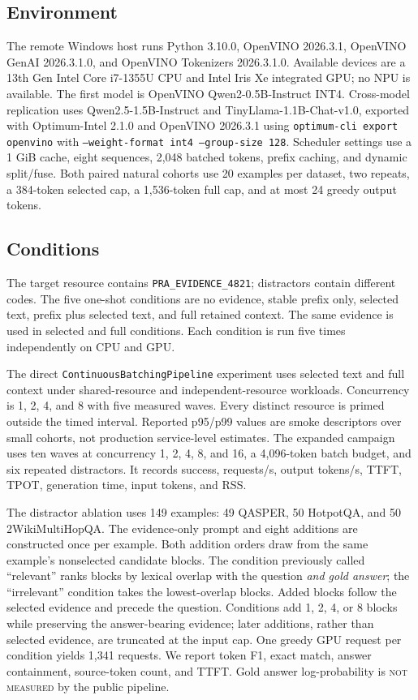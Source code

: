 \documentclass[10pt]{article}
\begin{document}
\subsection{Environment}
The remote Windows host runs Python 3.10.0, OpenVINO 2026.3.1, OpenVINO GenAI
2026.3.1.0, and OpenVINO Tokenizers 2026.3.1.0. Available devices are a 13th
Gen Intel Core i7-1355U CPU and Intel Iris Xe integrated GPU; no NPU is
available. The first model is OpenVINO Qwen2-0.5B-Instruct INT4. Cross-model
replication uses Qwen2.5-1.5B-Instruct and TinyLlama-1.1B-Chat-v1.0, exported
with Optimum-Intel 2.1.0 and OpenVINO 2026.3.1 using
\texttt{optimum-cli export openvino} with
\texttt{--weight-format int4 --group-size 128}. Scheduler settings use a 1 GiB cache, eight sequences,
2,048 batched tokens, prefix caching, and dynamic split/fuse. Both paired
natural cohorts use 20 examples per dataset, two repeats, a 384-token selected
cap, a 1,536-token full cap, and at most 24 greedy output tokens.

\subsection{Conditions}
The target resource contains \texttt{PRA\_EVIDENCE\_4821}; distractors contain
different codes. The five one-shot conditions are no evidence, stable prefix
only, selected text, prefix plus selected text, and full retained context. The
same evidence is used in selected and full conditions. Each condition is run
five times independently on CPU and GPU.

The direct \texttt{ContinuousBatchingPipeline} experiment uses selected text
and full context under shared-resource and independent-resource workloads.
Concurrency is 1, 2, 4, and 8 with five measured waves. Every distinct resource
is primed outside the timed interval. Reported p95/p99 values are smoke
descriptors over small cohorts, not production service-level estimates.
The expanded campaign uses ten waves at concurrency 1, 2, 4, 8, and 16, a
4,096-token batch budget, and six repeated distractors. It records success,
requests/s, output tokens/s, TTFT, TPOT, generation time, input tokens, and RSS.

The distractor ablation uses 149 examples: 49 QASPER, 50 HotpotQA, and 50
2WikiMultiHopQA. The evidence-only prompt and eight additions are constructed
once per example. Both addition orders draw from the same example's nonselected
candidate blocks. The condition previously called ``relevant'' ranks blocks by
lexical overlap with the question \emph{and gold answer}; the ``irrelevant''
condition takes the lowest-overlap blocks. Added blocks follow the selected
evidence and precede the question. Conditions add 1, 2, 4, or 8 blocks while
preserving the answer-bearing evidence; later additions, rather than selected
evidence, are truncated at the input cap. One greedy GPU request per condition
yields 1,341 requests. We report token F1, exact match, answer containment,
source-token count, and TTFT. Gold answer log-probability is
\textsc{not measured} by the public pipeline.
\end{document}
